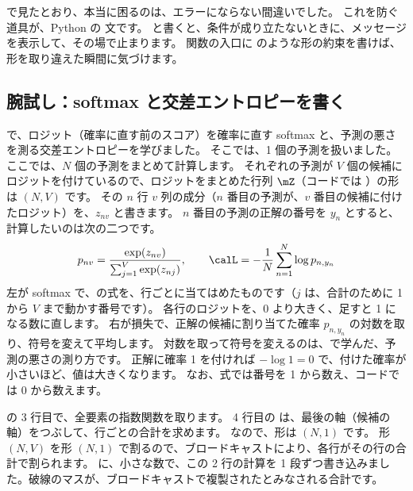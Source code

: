 で見たとおり、本当に困るのは、エラーにならない間違いでした。
これを防ぐ道具が、Python の  文です。
 と書くと、条件が成り立たないときに、メッセージを表示して、その場で止まります。
関数の入口に  のような形の約束を書けば、形を取り違えた瞬間に気づけます。

\subsection*{腕試し：softmax と交差エントロピーを書く}

で、ロジット（確率に直す前のスコア）を確率に直す softmax と、予測の悪さを測る交差エントロピーを学びました。
そこでは、1 個の予測を扱いました。ここでは、$N$ 個の予測をまとめて計算します。
それぞれの予測が $V$ 個の候補にロジットを付けているので、ロジットをまとめた行列 $\mZ$（コードでは ）の形は $(N,V)$ です。
その $n$ 行 $v$ 列の成分（$n$ 番目の予測が、$v$ 番目の候補に付けたロジット）を、$z_{nv}$ と書きます。
$n$ 番目の予測の正解の番号を $y_n$ とすると、計算したいのは次の二つです。
\begin{equation}
p_{nv}=\frac{\exp(z_{nv})}{\sum_{j=1}^{V}\exp(z_{nj})},
\qquad
\calL=-\frac{1}{N}\sum_{n=1}^{N}\log p_{n,y_n}
\label{eq:pt-ce}
\end{equation}
左が softmax で、の式を、行ごとに当てはめたものです（$j$ は、合計のために 1 から $V$ まで動かす番号です）。
各行のロジットを、0 より大きく、足すと 1 になる数に直します。
右が損失で、正解の候補に割り当てた確率 $p_{n,y_n}$ の対数を取り、符号を変えて平均します。
対数を取って符号を変えるのは、で学んだ、予測の悪さの測り方です。
正解に確率 1 を付ければ $-\log 1=0$ で、付けた確率が小さいほど、値は大きくなります。
なお、式では番号を 1 から数え、コードでは 0 から数えます。


 の 3 行目で、全要素の指数関数を取ります。
4 行目の  は、最後の軸（候補の軸）をつぶして、行ごとの合計を求めます。
 なので、形は $(N,1)$ です。
形 $(N,V)$ を形 $(N,1)$ で割るので、ブロードキャストにより、各行がその行の合計で割られます。
に、小さな数で、この 2 行の計算を 1 段ずつ書き込みました。破線のマスが、ブロードキャストで複製されたとみなされる合計です。

